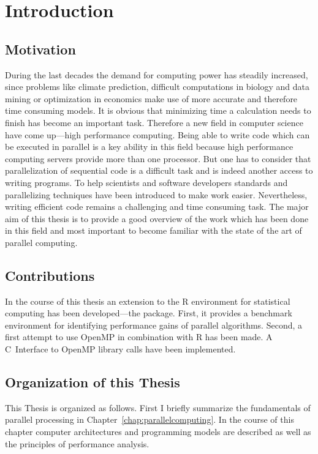\chapter{Introduction}
\section{Motivation}
During the last decades the demand for computing power has steadily
increased, since problems like climate prediction, difficult
computations in biology and data mining or optimization in economics
make use of more accurate and therefore time consuming models. It is
obvious that minimizing time a calculation needs to finish has become
an important task. Therefore a new field in computer science have come
up---high performance computing.
Being able to write code which can be executed in parallel is a key
ability in this field because high performance computing servers
provide more than one processor. But one has to consider that
parallelization of sequential code is a difficult task and is indeed
another access to writing programs. To help scientists and software
developers standards and parallelizing techniques have been introduced
to make work easier. Nevertheless, writing efficient code remains a
challenging and time consuming task. The major aim of this thesis is to
provide a good overview of the work which has been done in this field
and most important to become familiar with the state of the art of
parallel computing. 





\section{Contributions}
In the course of this thesis an extension to the R
environment for statistical computing has been developed---the
 package. First, it provides a benchmark environment for
identifying performance gains of parallel algorithms. Second, a first
attempt to use OpenMP in combination with R has been made. A
C~Interface to OpenMP library calls have been implemented.
 
\section{Organization of this Thesis}

This Thesis is organized as follows. First I briefly summarize the
fundamentals of parallel processing in
Chapter~\ref{chap:parallelcomputing}. In the course of this chapter
computer architectures and programming models are described as well as the
principles of performance analysis.

